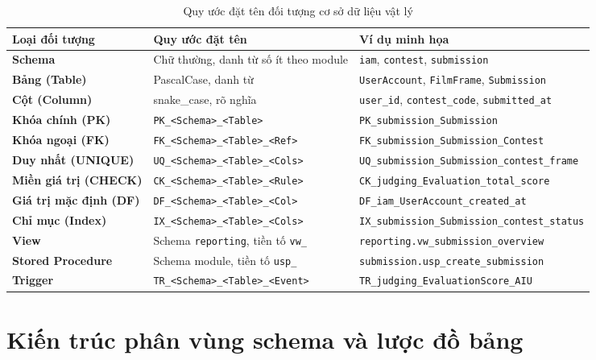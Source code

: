 \begin{table}[!ht]
\centering
\caption{Quy ước đặt tên đối tượng cơ sở dữ liệu vật lý}
\label{tab:c5_naming}
\footnotesize
\begin{tabularx}{\textwidth}{>{\bfseries}p{3.0cm}p{4.2cm}>{\raggedright\arraybackslash}X}
\toprule
\textbf{Loại đối tượng} & \textbf{Quy ước đặt tên} & \textbf{Ví dụ minh họa} \\
\midrule
Schema & Chữ thường, danh từ số ít theo module & \texttt{iam}, \texttt{contest}, \texttt{submission} \\
Bảng (Table) & PascalCase, danh từ & \texttt{UserAccount}, \texttt{FilmFrame}, \texttt{Submission} \\
Cột (Column) & snake\_case, rõ nghĩa & \texttt{user\_id}, \texttt{contest\_code}, \texttt{submitted\_at} \\
Khóa chính (PK) & \texttt{PK\_<Schema>\_<Table>} & \texttt{PK\_submission\_Submission} \\
Khóa ngoại (FK) & \texttt{FK\_<Schema>\_<Table>\_<Ref>} & \texttt{FK\_submission\_Submission\_Contest} \\
Duy nhất (UNIQUE) & \texttt{UQ\_<Schema>\_<Table>\_<Cols>} & \texttt{UQ\_submission\_Submission\_contest\_frame} \\
Miền giá trị (CHECK) & \texttt{CK\_<Schema>\_<Table>\_<Rule>} & \texttt{CK\_judging\_Evaluation\_total\_score} \\
Giá trị mặc định (DF) & \texttt{DF\_<Schema>\_<Table>\_<Col>} & \texttt{DF\_iam\_UserAccount\_created\_at} \\
Chỉ mục (Index) & \texttt{IX\_<Schema>\_<Table>\_<Cols>} & \texttt{IX\_submission\_Submission\_contest\_status} \\
View & Schema \texttt{reporting}, tiền tố \texttt{vw\_} & \texttt{reporting.vw\_submission\_overview} \\
Stored Procedure & Schema module, tiền tố \texttt{usp\_} & \texttt{submission.usp\_create\_submission} \\
Trigger & \texttt{TR\_<Schema>\_<Table>\_<Event>} & \texttt{TR\_judging\_EvaluationScore\_AIU} \\
\bottomrule
\end{tabularx}
\end{table}

\section{Kiến trúc phân vùng schema và lược đồ bảng}
\label{s:c5_schemas}

